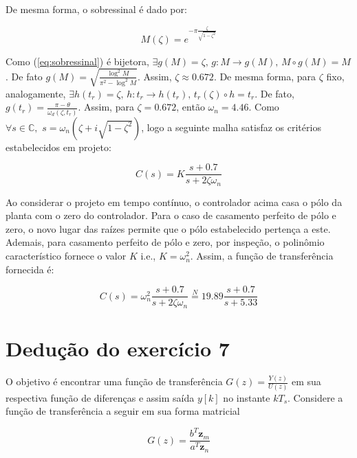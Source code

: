 \documentclass[twoside, fleqn]{article}
\begin{document}
    De mesma forma, o sobressinal é dado por:
    
        \begin{equation}
            M(\zeta) = e^{-\pi \frac{\zeta}{\sqrt{1-\zeta^2}}}
            \label{eq:sobressinal}
        \end{equation}
    
    Como (\ref{eq:sobressinal}) é bijetora, $\exists g(M) = \zeta \mbox{, } g: M \rightarrow g(M) \mbox{, } M \circ g (M) = M$. De fato $g(M) = \sqrt{\frac{\log^2{M}}{\pi^2 - \log^2{M}}}$. Assim, $\zeta \approx 0.672$. De mesma forma, para $\zeta$ fixo, analogamente, $\exists h(t_r) = \zeta\mbox{, }h: t_r \rightarrow h(t_r)\mbox{, } t_r(\zeta) \circ h = t_r$. De fato, $g(t_r) = \frac{\pi - \theta}{\omega_d(\zeta, t_r)}$. Assim, para $\zeta = 0.672$, então $\omega_n = 4.46$.
    Como $\forall s \in \mathbb{C}, \,\, s = \omega_n (\zeta + i \sqrt{1 - \zeta^2})$, logo a seguinte malha satisfaz os critérios estabelecidos em projeto:
    
        \begin{equation}
            C(s) = K \frac{s + 0.7}{s + 2 \zeta \omega_n}
        \end{equation}
    
    Ao considerar o projeto em tempo contínuo, o controlador acima casa o pólo da planta com o zero do controlador. Para o caso de casamento perfeito de pólo e zero, o novo lugar das raízes permite que o pólo estabelecido pertença a este. Ademais, para casamento perfeito de pólo e zero, por inspeção, o polinômio característico fornece o valor $K$ i.e., $K = \omega_n^2$. Assim, a função de transferência fornecida é:
    
        \begin{equation}
            C(s) = \omega_n^2 \frac{s + 0.7}{s + 2 \zeta \omega_n} \stackrel{N}{=} 19.89 \frac{s + 0.7}{s + 5.33}
        \end{equation}

\section*{Dedução do exercício 7}
\label{sec:deducao7}

    O objetivo é encontrar uma função de transferência $G(z) = \frac{Y(z)}{U(z)}$ em sua respectiva função de diferenças e assim saída $y[k]$ no instante $k T_s$. Considere a função de transferência a seguir em sua forma matricial
    
        \begin{equation}
            G(z) = \frac{b^T \textbf{z}_m}{a^T \textbf{z}_n}    
            \label{eq:Gz}
        \end{equation}
    
\end{document}
